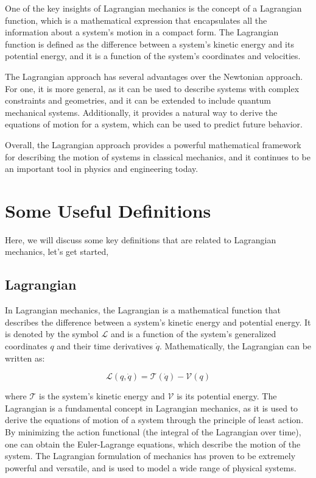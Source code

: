 \documentclass[12pt, a4paper]{article} %
\begin{document}
One of the key insights of Lagrangian mechanics is the concept of a Lagrangian function, which is a mathematical expression that encapsulates all the information about a system's motion in a compact form. The Lagrangian function is defined as the difference between a system's kinetic energy and its potential energy, and it is a function of the system's coordinates and velocities.

The Lagrangian approach has several advantages over the Newtonian approach. For one, it is more general, as it can be used to describe systems with complex constraints and geometries, and it can be extended to include quantum mechanical systems. Additionally, it provides a natural way to derive the equations of motion for a system, which can be used to predict future behavior.

Overall, the Lagrangian approach provides a powerful mathematical framework for describing the motion of systems in classical mechanics, and it continues to be an important tool in physics and engineering today.

\newpage

\section{Some Useful Definitions}

\BgThispage

Here, we will discuss some key definitions that are related to Lagrangian mechanics, let's get started,

\subsection{Lagrangian}

In Lagrangian mechanics, the Lagrangian is a mathematical function that describes the difference between a system's kinetic energy and potential energy. It is denoted by the symbol $\mathscr{L}$ and is a function of the system's generalized coordinates $q$ and their time derivatives $\dot{q}$. Mathematically, the Lagrangian can be written as:

\[\mathscr{L}(q, \dot{q}) = \mathcal{T}(\dot{q}) - \mathcal{V}(q)\]

where $\mathcal{T}$ is the system's kinetic energy and $\mathcal{V}$ is its potential energy. The Lagrangian is a fundamental concept in Lagrangian mechanics, as it is used to derive the equations of motion of a system through the principle of least action. By minimizing the action functional (the integral of the Lagrangian over time), one can obtain the Euler-Lagrange equations, which describe the motion of the system. The Lagrangian formulation of mechanics has proven to be extremely powerful and versatile, and is used to model a wide range of physical systems.
\end{document}
